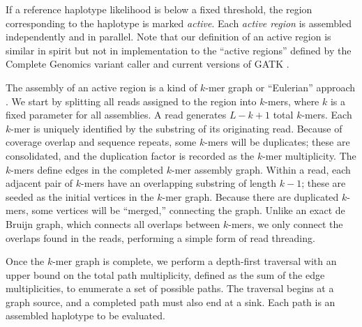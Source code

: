 \documentclass{acm_proc_article-sp}
\begin{document}
If a reference haplotype likelihood is below a fixed threshold,
the region corresponding to the haplotype is marked \emph{active}.
Each \emph{active region} is assembled independently and in parallel.
Note that our definition of an active region is similar in spirit but not in
implementation to the ``active regions'' defined by the Complete Genomics
variant caller \cite{carnevali12} and current versions of GATK \cite{depristo11}.

The assembly of an active region is a kind of $k$-mer graph or ``Eulerian''
approach \cite{pevzner01}.
We start by splitting all reads assigned to the region into $k$-mers, where $k$
is a fixed parameter for all assemblies.
A read generates $L-k+1$ total $k$-mers.
Each $k$-mer is uniquely identified by the substring of its originating read.
Because of coverage overlap and sequence repeats, some $k$-mers will be
duplicates;
these are consolidated, and the duplication factor is recorded as the
$k$-mer multiplicity.
The $k$-mers define edges in the completed $k$-mer assembly graph.
Within a read, each adjacent pair of $k$-mers have an overlapping substring of
length $k-1$;
these are seeded as the initial vertices in the $k$-mer graph.
Because there are duplicated $k$-mers, some vertices will be ``merged,''
connecting the graph.
Unlike an exact de Bruijn graph, which connects all overlaps between $k$-mers,
we only connect the overlaps found in the reads, performing a simple form of
read threading.

Once the $k$-mer graph is complete, we perform a depth-first traversal with an
upper bound on the total path multiplicity, defined as the sum of the edge
multiplicities, to enumerate a set of possible paths.
The traversal begins at a graph source, and a completed path must also end at a
sink.
Each path is an assembled haplotype to be evaluated.
\end{document}
